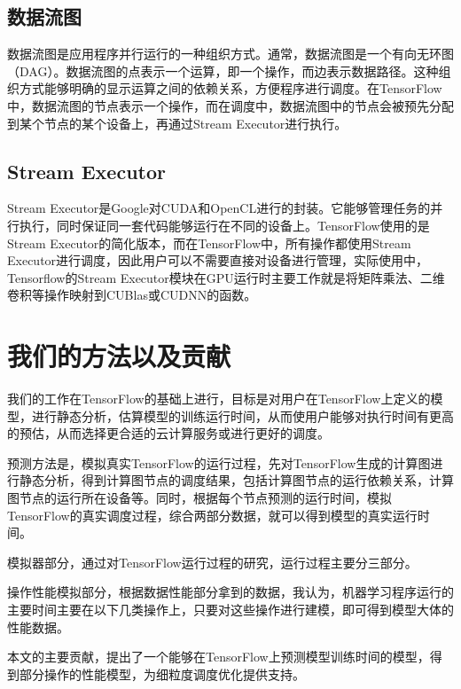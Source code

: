 \subsection{数据流图}
    数据流图是应用程序并行运行的一种组织方式。通常，数据流图是一个有向无环图（DAG）。数据流图的点表示一个运算，即一个操作，而边表示数据路径。这种组织方式能够明确的显示运算之间的依赖关系，方便程序进行调度。在TensorFlow中，数据流图的节点表示一个操作，而在调度中，数据流图中的节点会被预先分配到某个节点的某个设备上，再通过Stream Executor进行执行。

\subsection{Stream Executor}
    Stream Executor是Google对CUDA和OpenCL进行的封装。它能够管理任务的并行执行，同时保证同一套代码能够运行在不同的设备上。TensorFlow使用的是Stream Executor的简化版本，而在TensorFlow中，所有操作都使用Stream Executor进行调度，因此用户可以不需要直接对设备进行管理，实际使用中，Tensorflow的Stream Executor模块在GPU运行时主要工作就是将矩阵乘法、二维卷积等操作映射到CUBlas或CUDNN的函数。

\section{我们的方法以及贡献}
    我们的工作在TensorFlow的基础上进行，目标是对用户在TensorFlow上定义的模型，进行静态分析，估算模型的训练运行时间，从而使用户能够对执行时间有更高的预估，从而选择更合适的云计算服务或进行更好的调度。
    
    预测方法是，模拟真实TensorFlow的运行过程，先对TensorFlow生成的计算图进行静态分析，得到计算图节点的调度结果，包括计算图节点的运行依赖关系，计算图节点的运行所在设备等。同时，根据每个节点预测的运行时间，模拟TensorFlow的真实调度过程，综合两部分数据，就可以得到模型的真实运行时间。
    
    模拟器部分，通过对TensorFlow运行过程的研究，运行过程主要分三部分。
    
    操作性能模拟部分，根据数据性能部分拿到的数据，我认为，机器学习程序运行的主要时间主要在以下几类操作上，只要对这些操作进行建模，即可得到模型大体的性能数据。
    
    本文的主要贡献，提出了一个能够在TensorFlow上预测模型训练时间的模型，得到部分操作的性能模型，为细粒度调度优化提供支持。
